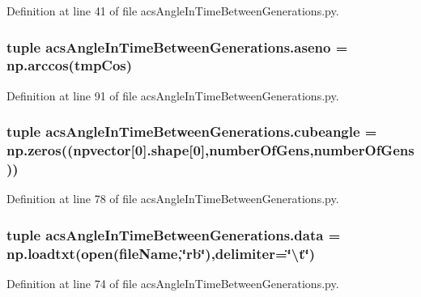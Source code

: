 Definition at line 41 of file acs\-Angle\-In\-Time\-Between\-Generations.\-py.

\hypertarget{a00090_ac5c8e440ab927fcfdf1bc4411d0f901c}{
\subsubsection[{aseno}]{\setlength{\rightskip}{0pt plus 5cm}tuple acs\-Angle\-In\-Time\-Between\-Generations.\-aseno = np.\-arccos({\bf tmp\-Cos})}}\label{a00090_ac5c8e440ab927fcfdf1bc4411d0f901c}


Definition at line 91 of file acs\-Angle\-In\-Time\-Between\-Generations.\-py.

\hypertarget{a00090_aa7a5bbed8bb957c1d48a86d058e9dba9}{
\subsubsection[{cubeangle}]{\setlength{\rightskip}{0pt plus 5cm}tuple acs\-Angle\-In\-Time\-Between\-Generations.\-cubeangle = np.\-zeros(({\bf npvector}\mbox{[}0\mbox{]}.shape\mbox{[}0\mbox{]},{\bf number\-Of\-Gens},{\bf number\-Of\-Gens}))}}\label{a00090_aa7a5bbed8bb957c1d48a86d058e9dba9}


Definition at line 78 of file acs\-Angle\-In\-Time\-Between\-Generations.\-py.

\hypertarget{a00090_a6b62fbc94ad1a2b022ec05389a1a5da8}{
\subsubsection[{data}]{\setlength{\rightskip}{0pt plus 5cm}tuple acs\-Angle\-In\-Time\-Between\-Generations.\-data = np.\-loadtxt(open({\bf file\-Name},\char`\"{}rb\char`\"{}),delimiter=\char`\"{}\textbackslash{}t\char`\"{})}}\label{a00090_a6b62fbc94ad1a2b022ec05389a1a5da8}


Definition at line 74 of file acs\-Angle\-In\-Time\-Between\-Generations.\-py.


